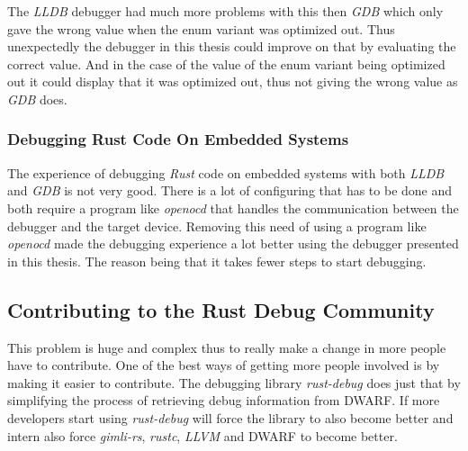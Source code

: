 The \emph{LLDB} debugger had much more problems with this then \emph{GDB} which only gave the wrong value when the enum variant was optimized out.
Thus unexpectedly the debugger in this thesis could improve on that by evaluating the correct value.
And in the case of the value of the  enum variant being optimized out it could display that it was optimized out, thus not giving the wrong value as \emph{GDB} does.


\subsubsection{Debugging Rust Code On Embedded Systems}
The experience of debugging \emph{Rust} code on embedded systems with both \emph{LLDB} and \emph{GDB} is not very good.
There is a lot of configuring that has to be done and both require a program like \emph{openocd} that handles the communication between the debugger and the target device.
Removing this need of using a program like \emph{openocd} made the debugging experience a lot better using the debugger presented in this thesis.
The reason being that it takes fewer steps to start debugging.


\subsection{Contributing to the Rust Debug Community}
This problem is huge and complex thus to really make a change in more people have to contribute.
One of the best ways of getting more people involved is by making it easier to contribute.
The debugging library \emph{rust-debug} does just that by simplifying the process of retrieving debug information from \gls{DWARF}.
If more developers start using \emph{rust-debug} will force the library to also become better and intern also force \emph{gimli-rs}, \emph{rustc}, \emph{LLVM} and \gls{DWARF} to become better.

